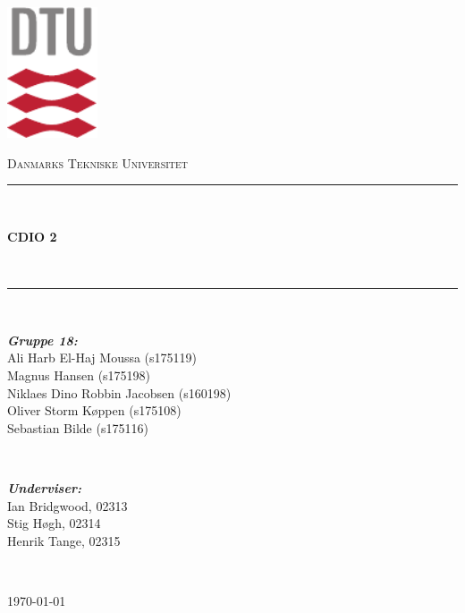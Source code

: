 \begin{titlepage}
	\centering
	\includegraphics[width=0.2\textwidth]{graphics/dtu/DTU-logo-CMYK}\par\vspace{1cm}
	{\scshape\LARGE Danmarks Tekniske Universitet \par}
	\vspace{3.5cm}
	\rule{\linewidth}{0.2 mm} \\[0.4 cm]
	{\huge\bfseries CDIO 2 \par} \
	\rule{\linewidth}{0.2 mm} \\[1.5 cm]
	\vspace{1cm}
	
	\begin{minipage}{0.5\textwidth}
		\begin{flushleft}
			\small
			\emph{\textbf{Gruppe 18:}}\\
			Ali Harb El-Haj Moussa (s175119) \\
			Magnus Hansen (s175198) \\
			Niklaes Dino Robbin Jacobsen (s160198) \\
			Oliver Storm Køppen (s175108) \\
			Sebastian Bilde (s175116)
		\end{flushleft}
	\end{minipage}
	~
	\begin{minipage}{0.4\textwidth}
		\begin{flushright}
			\small
			\emph{\textbf{Underviser:}} \\
			Ian Bridgwood, 02313 \\
			Stig Høgh, 02314 \\
			Henrik Tange, 02315
		\end{flushright}
	\end{minipage}\\[4cm]
	
	\vfill
	{\large \today\par}
\end{titlepage}

\pagebreak

